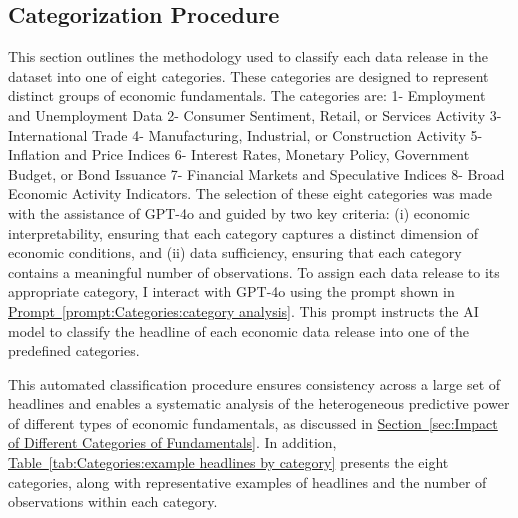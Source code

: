 \documentclass[12pt,oneside,letter]{article}
\newcommand*{\mytab}[1]{\hyperref[{#1}]{Table~\ref*{#1}}}
\newcommand*{\myprp}[1]{\hyperref[{#1}]{Prompt~\ref*{#1}}}
\newcommand*{\mysec}[1]{\hyperref[{#1}]{Section~\ref*{#1}}}
\begin{document}
\begin{appendices}
		\section{Categorization Procedure} \label{Appendix:Categories prodecure}
		This section outlines the methodology used to classify each data release in the dataset into one of eight categories. These categories are designed to represent distinct groups of economic fundamentals. The categories are: 1- Employment and Unemployment Data 2- Consumer Sentiment, Retail, or Services Activity 3- International Trade 4- Manufacturing, Industrial, or Construction Activity 5- Inflation and Price Indices 6- Interest Rates, Monetary Policy, Government Budget, or Bond Issuance 7- Financial Markets and Speculative Indices 8- Broad Economic Activity Indicators. 
		The selection of these eight categories was made with the assistance of GPT-4o and guided by two key criteria: (i) economic interpretability, ensuring that each category captures a distinct dimension of economic conditions, and (ii) data sufficiency, ensuring that each category contains a meaningful number of observations. To assign each data release to its appropriate category, I interact with GPT-4o using the prompt shown in \myprp{prompt:Categories:category analysis}. This prompt instructs the AI model to classify the headline of each economic data release into one of the predefined categories.
		\begin{prompt}[H]
			\centering
			\caption{}
			\label{prompt:Categories:category analysis}
		\end{prompt}
		\vspace{-20pt}This automated classification procedure ensures consistency across a large set of headlines and enables a systematic analysis of the heterogeneous predictive power of different types of economic fundamentals, as discussed in \mysec{sec:Impact of Different Categories of Fundamentals}. In addition, \mytab{tab:Categories:example headlines by category} presents the eight categories, along with representative examples of headlines and the number of observations within each category.
		

\end{appendices}
\end{document}
